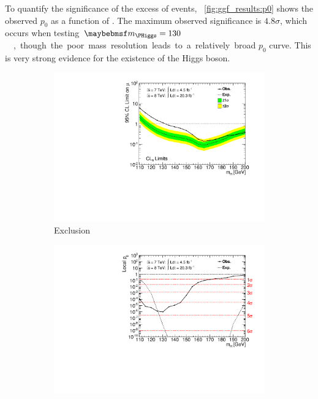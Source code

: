 To quantify the significance of the excess of events, \Figure~\ref{fig:ggf_results:p0} shows 
the observed $p_0$ as a function of \mH. The maximum observed significance is $4.8\sigma$, 
which occurs when testing \unit{$\mH = 130$}{\GeV}, though the poor mass resolution leads to 
a relatively broad $p_0$ curve. This is very strong evidence for the existence of the Higgs 
boson.

\begin{figure}[t]
	\begin{subfigure}[b]{0.495\textwidth}
		\centering
		\includegraphics[width=\textwidth,clip=true,trim=0.6cm 0.8cm 1.0cm 0.4cm]{custom_images/limits/cls_ggf_only}
		\caption{Exclusion}
		\label{fig:ggf_results:CLs}
	\end{subfigure}
	\hfill
	\begin{subfigure}[b]{0.495\textwidth}
		\centering
		\includegraphics[width=\textwidth,clip=true,trim=0.6cm 0.8cm 1.0cm 0.4cm]{custom_images/limits/p0_ggf_only}

\end{subfigure}
\end{figure}
